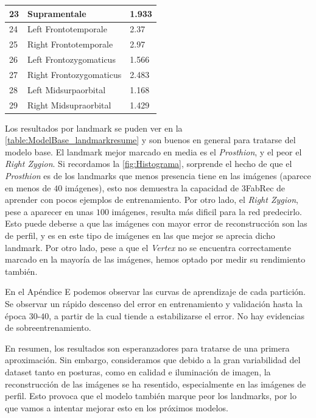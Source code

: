 \begin{table}[!ht]
\begin{tabular}{|l|l|l|}
                23 & Supramentale & 1.933 \\ \hline
                24 & Left Frontotemporale & 2.37 \\ \hline
                25 & Right Frontotemporale & 2.97 \\ \hline
                26 & Left Frontozygomaticus & 1.566 \\ \hline
                27 & Right Frontozygomaticus & 2.483 \\ \hline
                28 & Left Midsurpaorbital & 1.168 \\ \hline
                29 & Right Midsupraorbital & 1.429 \\ \hline
            \end{tabular}
            \label{table:ModelBase_landmarkresume}
        \end{table}
        \medskip

        \noindent Los resultados por landmark se puden ver en la \autoref{table:ModelBase_landmarkresume} y son buenos en general para tratarse del modelo base. El landmark mejor marcado en media es el \textit{Prosthion}, y el peor el \textit{Right Zygion}. Si recordamos la \autoref{fig:Histograma}, sorprende el hecho de que el \textit{Prosthion} es de los landmarks que menos presencia tiene en las imágenes (aparece en menos de $40$ imágenes), esto nos demuestra la capacidad de 3FabRec de aprender con pocos ejemplos de entrenamiento. Por otro lado, el \textit{Right Zygion}, pese a aparecer en unas $100$ imágenes, resulta más dificil para la red predecirlo. Esto puede deberse a que las imágenes con mayor error de reconstrucción son las de perfil, y es en este tipo de imágenes en las que mejor se aprecia dicho landmark. Por otro lado, pese a que el \textit{Vertex} no se encuentra correctamente marcado en la mayoría de las imágenes, hemos optado por medir su rendimiento también.

        \medskip

        \noindent En el Apéndice E podemos observar las curvas de aprendizaje de cada partición. Se observar un rápido descenso del error en entrenamiento y validación hasta la época $30$-$40$, a partir de la cual tiende a estabilizarse el error. No hay evidencias de sobreentrenamiento.

        \noindent En resumen, los resultados son esperanzadores para tratarse de una primera aproximación. Sin embargo, consideramos que debido a la gran variabilidad del dataset tanto en posturas, como en calidad e iluminación de imagen, la reconstrucción de las imágenes se ha resentido, especialmente en las imágenes de perfil. Esto provoca que el modelo también marque peor los landmarks, por lo que vamos a intentar mejorar esto en los próximos modelos. 
        
